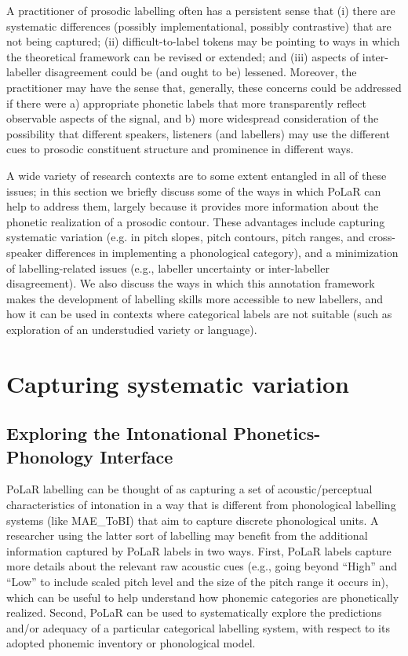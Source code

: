 \documentclass[11pt, twoside]{memoir}
\begin{document}
A practitioner of prosodic labelling often has a persistent sense that (i) there are systematic differences (possibly implementational, possibly contrastive) that are not being captured; (ii) difficult-to-label tokens may be pointing to ways in which the theoretical framework can be revised or extended; and (iii) aspects of inter-labeller disagreement could be (and ought to be) lessened. Moreover, the practitioner may have the sense that, generally, these concerns could be addressed if there were a) appropriate phonetic labels that more transparently reflect observable aspects of the signal, and b) more widespread consideration of the possibility that different speakers, listeners (and labellers) may use the different cues to prosodic constituent structure and prominence in different ways.

A wide variety of research contexts are to some extent entangled in all of these issues; in this section we briefly discuss some of the ways in which PoLaR can help to address them, largely because it provides more information about the phonetic realization of a prosodic contour. These advantages include capturing systematic variation (e.g. in pitch slopes, pitch contours, pitch ranges, and cross-speaker differences in implementing a phonological category), and a minimization of labelling-related issues (e.g., labeller uncertainty or inter-labeller disagreement). We also discuss the ways in which this annotation framework makes the development of labelling skills more accessible to new labellers, and how it can be used in contexts where categorical labels are not suitable (such as exploration of an understudied variety or language). 


\section{Capturing systematic variation}\label{sec:capturing-systematic-variation}

\subsection{Exploring the Intonational Phonetics-Phonology Interface}\label{sec:exploring-phonetics-phonology-interface}
PoLaR labelling can be thought of as capturing a set of acoustic\slash perceptual characteristics of intonation in a way that is different from phonological labelling systems (like MAE\_ToBI) that aim to capture discrete phonological units. A researcher using the latter sort of labelling may benefit from the additional information captured by PoLaR labels in two ways. First, PoLaR labels capture more details about the relevant raw acoustic cues (e.g., going beyond “High” and “Low” to include scaled pitch level and the size of the pitch range it occurs in), which can be useful to help understand how phonemic categories are phonetically realized. Second, PoLaR can be used to systematically explore the predictions and/or adequacy of a particular categorical labelling system, with respect to its adopted phonemic inventory or phonological model.
\end{document}
